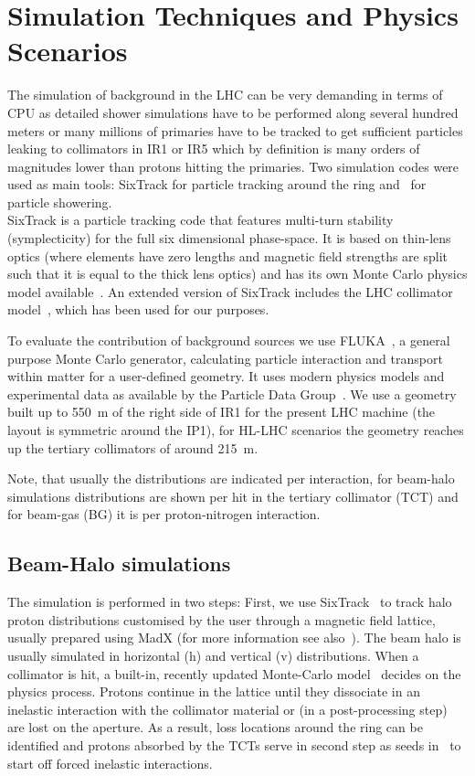 \section{Simulation Techniques and Physics Scenarios\label{simSetup}}

The simulation of background in the LHC can be very demanding in terms of CPU as detailed shower simulations have to be performed along several hundred meters or many millions of primaries have to be tracked to get sufficient particles leaking to collimators in IR1 or IR5 which by definition is many orders of magnitudes lower than protons hitting the primaries. Two simulation codes were used as main tools: SixTrack for particle tracking around the ring and \fluka~for particle showering.\\

 SixTrack is a particle tracking code that features multi-turn stability (symplecticity) for the full six dimensional phase-space. It is based on thin-lens optics (where elements have zero lengths and magnetic field strengths are split such that it is equal to the thick lens optics) and has its own Monte Carlo physics model available~\cite{K2Ref}. An extended version of SixTrack includes the LHC collimator model~\cite{SixTrackRef}, which has been used for our purposes.

To evaluate the contribution of background sources we use FLUKA~\cite{flukaRef1,flukaRef2}, a general purpose Monte Carlo generator, calculating particle interaction and transport within matter for a user-defined geometry. It uses modern physics models and experimental data as available by the Particle Data Group~\cite{pdgRef}.
We use a geometry built up to 550~m of the right side of IR1 for the present LHC machine (the layout is symmetric around the IP1), for HL-LHC scenarios the geometry reaches up the tertiary collimators of around 215~m. 

Note, that usually the distributions are indicated per interaction, for beam-halo simulations distributions are shown per hit in the tertiary collimator (TCT) and for beam-gas (BG) it is per proton-nitrogen interaction.

\subsection{Beam-Halo simulations}
The simulation is performed in two steps: First, we use SixTrack~\cite{SixTrackRef} to track halo proton distributions customised by the user through a magnetic field lattice, usually prepared using MadX (for more information see also~\cite{chiarasThesis}). The beam halo is usually simulated in horizontal (h) and vertical (v) distributions. When a collimator is hit, a built-in, recently updated Monte-Carlo model~\cite{claudiasThesis} decides on the physics process. Protons continue in the lattice until they dissociate in an inelastic interaction with the collimator material or (in a post-processing step) are lost on the aperture. As a result, loss locations around the ring can be identified and protons absorbed by the TCTs serve in second step as seeds in \fluka~to start off forced inelastic interactions.

